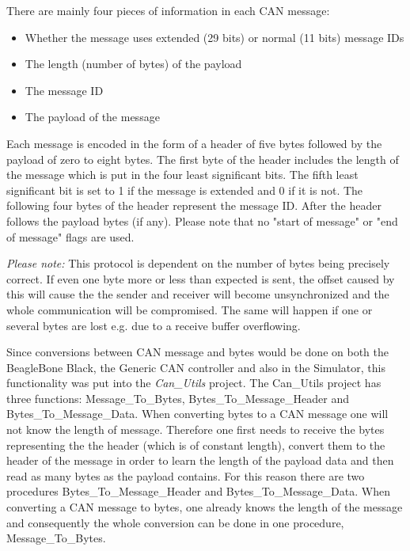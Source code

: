 There are mainly four pieces of information in each CAN message: 
\begin{itemize}
   \item { Whether the message uses extended (29 bits) or normal (11 bits) message IDs} 
   \item { The length (number of bytes) of the payload} 
   \item { The message ID}
   \item { The payload of the message}
\end{itemize}

Each message is encoded in the form of a header of five bytes followed by the payload of zero to eight bytes. The first byte of the header includes the length of the message which is put in the four least significant bits. The fifth least significant bit is set to 1 if the message is extended and 0 if it is not. \newline
The following four bytes of the header represent the message ID. \newline
After the header follows the payload bytes (if any). \newline
Please note that no "start of message" or "end of message" flags are used.

\emph{Please note:} This protocol is dependent on the number of bytes being precisely correct. If even one byte more or less than expected is sent, the offset caused by this will cause the the sender and receiver will become unsynchronized and the whole communication will be compromised. The same will happen if one or several bytes are lost e.g. due to a receive buffer overflowing. \newline

Since conversions between CAN message and bytes would be done on both the BeagleBone Black, the Generic CAN controller and also in the Simulator, this functionality was put into the \emph{Can\_Utils} project. \newline
The Can\_Utils project has three functions: Message\_To\_Bytes, Bytes\_To\_Message\_Header and Bytes\_To\_Message\_Data.  \newline
When converting bytes to a CAN message one will not know the length of message. Therefore one first needs to receive the bytes representing the the header (which is of constant length), convert them to the header of the message in order to learn the length of the payload data and then read as many bytes as the payload contains. \newline
For this reason there are two procedures Bytes\_To\_Message\_Header and Bytes\_To\_Message\_Data.  \newline
When converting a CAN message to bytes, one already knows the length of the message and consequently the whole conversion can be done in one procedure, Message\_To\_Bytes.

